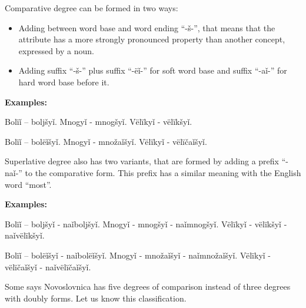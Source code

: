 Comparative degree can be formed in two ways: 

\begin{itemize}
	\item Adding between word base and word ending “-š-”, that means that the attribute has a more strongly pronounced property than another concept, expressed by a noun.
	\item Adding suffix “-š-” plus suffix “-ëǐ-” for soft word base and suffix “-aǐ-” for hard word base before it.
\end{itemize}

\textbf{Examples:}

Bolïǐ – boljšyǐ. Mnogyǐ - mnogšyǐ. Vëlïkyǐ - vëlïkšyǐ.

Bolïǐ – bolëǐšyǐ. Mnogyǐ - množaǐšyǐ. Vëlïkyǐ - vëlïčaǐšyǐ.

Superlative degree also has two variants, that are formed by adding a prefix “-naǐ-” to the comparative form. This prefix has a similar meaning with the English word “most”.

\textbf{Examples:}

Bolïǐ – boljšyǐ - naǐboljšyǐ. Mnogyǐ - mnogšyǐ - naǐmnogšyǐ. Vëlïkyǐ - vëlïkšyǐ - naǐvëlïkšyǐ.

Bolïǐ – bolëǐšyǐ - naǐbolëǐšyǐ. Mnogyǐ - množaǐšyǐ - naǐmnožaǐšyǐ. Vëlïkyǐ - vëlïčaǐšyǐ - naǐvëlïčaǐšyǐ.

Some says Novoslovnica has five degrees of comparison instead of three degrees with doubly forms. Let us know this classification.

